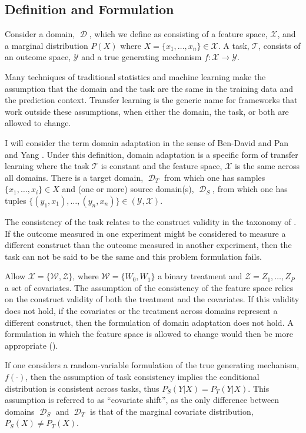\documentclass[a4paper,12pt]{article}
\DeclareMathOperator*{\D}{\mathcal{D}}
\begin{document}
\subsection{Definition and Formulation}

Consider a domain, $\D$, which we define as consisting of a feature space, $\mathcal{X}$, and a marginal distribution $P(X)$ where $X = \{x_1,\ldots,x_n\} \in \mathcal{X}$. A task, $\mathcal{T}$, consists of an outcome space, $\mathcal{Y}$ and a true generating mechanism $f: \mathcal{X} \rightarrow \mathcal{Y}$.

Many techniques of traditional statistics and machine learning make the assumption that the domain and the task are the same in the training data and the prediction context. Transfer learning is the generic name for frameworks that work outside these assumptions, when either the domain, the task, or both are allowed to change. 

I will consider the term domain adaptation in the sense of Ben-David \parencite*{Ben-David2006} and Pan and Yang \parencite*{Pan2010}. Under this definition, domain adaptation is a specific form of transfer learning where the task $\mathcal{T}$ is constant and the feature space, $\mathcal{X}$ is the same across all domains. There is a target domain, $\D_T$ from which one has samples $\{x_1,\ldots,x_i\} \in X$ and (one or more) source domain(s), $\D_S$, from which one has tuples $\{(y_1, x_1),\dots,(y_n, x_n)\} \in (\mathcal{Y}, \mathcal{X})$. 

The consistency of the task relates to the construct validity in the taxonomy of \cite{Shadish2002}. If the outcome measured in one experiment might be considered to measure a different construct than the outcome measured in another experiment, then the task can not be said to be the same and this problem formulation fails. 

Allow $\mathcal{X} = \{\mathcal{W}, \mathcal{Z}\}$, where $\mathcal{W} = \{W_0, W_1\}$ a binary treatment and $\mathcal{Z} = {Z_1,\ldots,Z_P}$ a set of covariates. The assumption of the consistency of the feature space relies on the construct validity of both the treatment and the covariates. If this validity does not hold, if the covariates or the treatment across domains represent a different construct, then the formulation of domain adaptation does not hold. A formulation in which the feature space is allowed to change would then be more appropriate (\cite{foo}). 

If one considers a random-variable formulation of the true generating mechanism, $f(\cdot)$, then the assumption of task consistency implies the conditional distribution is consistent across tasks, thus $P_S(Y | X) = P_T(Y | X)$. This assumption is referred to as ``covariate shift'', as the only difference between domains $\D_S$ and $\D_T$ is that of the marginal covariate distribution, $P_S(X) \neq P_T(X)$. 
\end{document}
